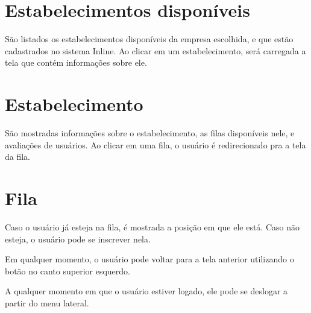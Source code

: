 \documentclass{book}
\begin{document}
\section{Estabelecimentos disponíveis}
São listados os estabelecimentos disponíveis da empresa escolhida, e que estão
cadastrados no sistema Inline. Ao clicar em um estabelecimento, será carregada a
tela que contém informações sobre ele.

\section{Estabelecimento}
São mostradas informações sobre o estabelecimento, as filas disponíveis nele, e
avaliações de usuários. Ao clicar em uma fila, o usuário é redirecionado pra a
tela da fila.

\section{Fila}
Caso o usuário já esteja na fila, é mostrada a posição em que ele está. Caso não
esteja, o usuário pode se inscrever nela.

Em qualquer momento, o usuário pode voltar para a tela anterior utilizando o
botão no canto superior esquerdo.

A qualquer momento em que o usuário estiver logado, ele pode se deslogar a
partir do menu lateral.
\end{document}
